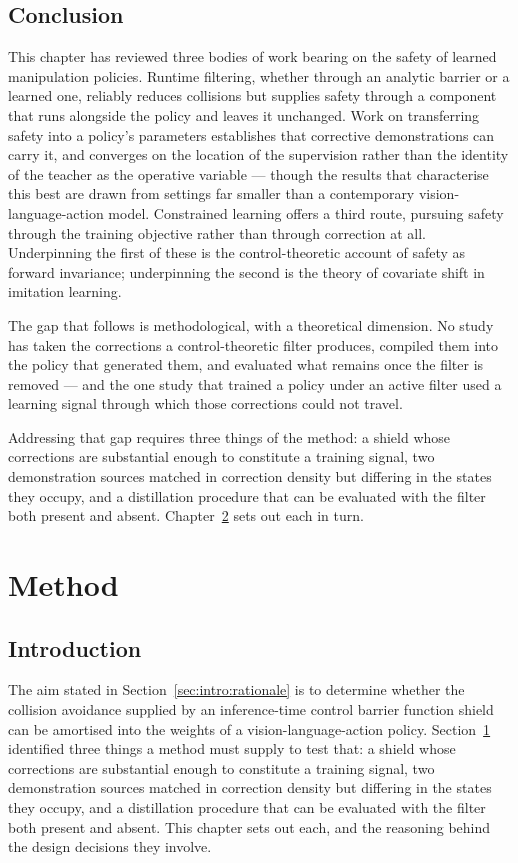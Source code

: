 \documentclass[a4paper,11pt]{report}
\begin{document}
\section{Conclusion}\label{sec:bg:conclusion}

This chapter has reviewed three bodies of work bearing on the safety of learned manipulation
policies. Runtime filtering, whether through an analytic barrier or a learned one, reliably reduces
collisions but supplies safety through a component that runs alongside the policy and leaves it
unchanged. Work on transferring safety into a policy's parameters establishes that corrective
demonstrations can carry it, and converges on the location of the supervision rather than the
identity of the teacher as the operative variable --- though the results that characterise this
best are drawn from settings far smaller than a contemporary vision-language-action model.
Constrained learning offers a third route, pursuing safety through the training objective rather
than through correction at all. Underpinning the first of these is the control-theoretic account of
safety as forward invariance; underpinning the second is the theory of covariate shift in imitation
learning.

The gap that follows is methodological, with a theoretical dimension. No study has taken the
corrections a control-theoretic filter produces, compiled them into the policy that generated them,
and evaluated what remains once the filter is removed --- and the one study that trained a policy
under an active filter used a learning signal through which those corrections could not travel.

Addressing that gap requires three things of the method: a shield whose corrections are substantial
enough to constitute a training signal, two demonstration sources matched in correction density but
differing in the states they occupy, and a distillation procedure that can be evaluated with the
filter both present and absent. Chapter~\ref{ch:method} sets out each in turn.

\chapter{Method}\label{ch:method}

\section{Introduction}\label{sec:method:intro}

The aim stated in Section~\ref{sec:intro:rationale} is to determine whether the collision avoidance
supplied by an inference-time control barrier function shield can be amortised into the weights of
a vision-language-action policy. Section~\ref{sec:bg:conclusion} identified three things a method
must supply to test that: a shield whose corrections are substantial enough to constitute a
training signal, two demonstration sources matched in correction density but differing in the
states they occupy, and a distillation procedure that can be evaluated with the filter both present
and absent. This chapter sets out each, and the reasoning behind the design decisions they involve.
\end{document}

